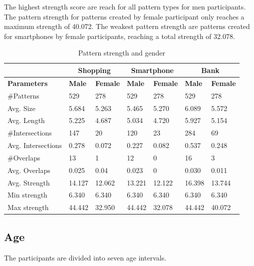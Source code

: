     The highest strength score are reach for all pattern types for men participants. The pattern strength for patterns created by female participant only reaches a maximum strength of 40.072. The weakest pattern strength are patterns created for smartphones by female participants, reaching a total strength of 32.078. 

    \begin{table}[H]
      \centering
      \begin{tabular}{l || l | l || l | l || l | l }
        \hline
         & \multicolumn{2}{c||}{\bf Shopping} & \multicolumn{2}{c||}{\bf Smartphone} &\multicolumn{2}{c}{\bf Bank} \\ \hline
        {\bf Parameters}   & {\bf Male} & {\bf Female} & {\bf Male} & {\bf Female} & {\bf Male} & {\bf Female}\\ \hline
        \#Patterns         & 529    & 278    & 529    & 278    & 529    & 278    \\
        Avg. Size          & 5.684  & 5.263  & 5.465  & 5.270  & 6.089  & 5.572  \\
        Avg. Length        & 5.225  & 4.687  & 5.034  & 4.720  & 5.927  & 5.154  \\
        \#Intersections    & 147    & 20     & 120    & 23     & 284    & 69     \\
        Avg. Intersections & 0.278  & 0.072  & 0.227  & 0.082  & 0.537  & 0.248  \\
        \#Overlaps         & 13     & 1      & 12     & 0      & 16     & 3      \\
        Avg. Overlaps      & 0.025  & 0.04   & 0.023  & 0      & 0.030  & 0.011  \\ \hline
        Avg. Strength      & 14.127 & 12.062 & 13.221 & 12.122 & 16.398 & 13.744 \\ 
        Min strength       & 6.340  & 6.340  & 6.340  & 6.340  & 6.340  & 6.340  \\
        Max strength       & 44.442 & 32.950  & 44.442 & 32.078 & 44.442 & 40.072 \\ \hline
      \end{tabular}
      \caption{Pattern strength and gender }
      \label{tab:gendertrength}
    \end{table}

	\subsection{Age}

    The participants are divided into seven age intervals.

